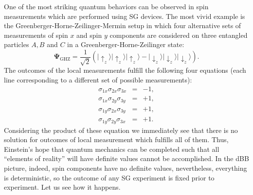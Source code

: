 \documentclass[12pt,preprint,tightenlines]{elsarticle}
\begin{document}
One of the most striking quantum behaviors can be observed in spin
measurements which are performed using SG devices. The
most vivid example is the Greenberger-Horne-Zeilinger-Mermin setup \cite{greenberger1989going,mermin1990quantum,greenberger1990bell}
in which four alternative sets of measurements of spin $x$ and spin
$y$ components are considered on three entangled particles $A,B$
and $C$ in a Greenberger-Horne-Zeilinger state:
\begin{equation}
\boldsymbol{\Psi}_{\mathrm{GHZ}}=\frac{1}{\sqrt{2}}\left(|\uparrow_{z}\rangle|\uparrow_{z}\rangle|\uparrow_{z}\rangle-|\downarrow_{z}\rangle|\downarrow_{z}\rangle|\downarrow_{z}\rangle\right).\end{equation}
 The outcomes of the local measurements fulfill the following four
equations (each line corresponding to a different set of possible
measurements):
\begin{eqnarray}
\sigma_{1x}\sigma_{2x}\sigma_{3x} & = & -1,\nonumber \\
\sigma_{1x}\sigma_{2y}\sigma_{3y} & = & +1,\\
\sigma_{1y}\sigma_{2x}\sigma_{3y} & = & +1,\nonumber \\
\sigma_{1y}\sigma_{2y}\sigma_{3x} & = & +1.\nonumber
\end{eqnarray}
 Considering the product of these equation we immediately see that
there is no solution for outcomes of local measurement which fulfills
all of them. Thus, Einstein's hope that quantum mechanics can be completed
such that all ``elements of reality'' will have definite values
cannot be accomplished. In the dBB picture, indeed, spin components
have no definite values, nevertheless, everything is deterministic,
so the outcome of any SG experiment is fixed prior to experiment.
Let us see how it happens.
\end{document}
